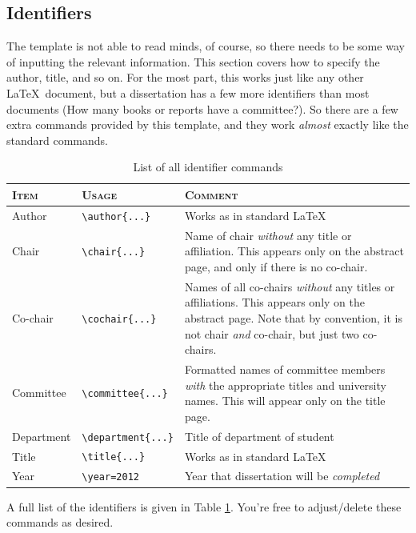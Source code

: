 \subsection{Identifiers}
The template is not able to read minds, of course, so there needs to be some way of inputting the relevant information.  
This section covers how to specify the author, title, and so on.  
For the most part, this works just like any other \LaTeX~document, but a dissertation has a few more identifiers than most documents (How many books or reports have a
committee?).  
So there are a few extra commands provided by this template, and they work \emph{almost} exactly like the standard commands.

\begin{table}
 \caption{ \label{tab:identifiers}
  List of all identifier commands}
 \centering
 \small
 \begin{tabular}{l @{\hspace{16pt}} l @{\hspace{16pt}} p{6cm}}
  \hline \hline
  \textsc{Item} & \textsc{Usage} & \textsc{Comment} \\
  \hline
  Author      & \verb|\author{...}|
   & Works as in standard \LaTeX \\
  Chair       & \verb|\chair{...}|
   & Name of chair \emph{without} any title or affiliation.  This
     appears only on the abstract page, and only if there is no
     co-chair. \\
  Co-chair    & \verb|\cochair{...}|
   & Names of all co-chairs \emph{without} any titles or
     affiliations.  This appears only on the abstract page.  Note
     that by convention, it is not chair \emph{and} co-chair, but
     just two co-chairs. \\
  Committee   & \verb|\committee{...}|
   & Formatted names of committee members \emph{with} the
     appropriate titles and university names.  This will appear
     only on the title page. \\
  Department  & \verb|\department{...}|
   & Title of department of student \\
  Title       & \verb|\title{...}|
   & Works as in standard \LaTeX \\
  Year        & \verb|\year=2012|
   & Year that dissertation will be \emph{completed} \\
  \hline \hline
 \end{tabular}
\end{table}

A full list of the identifiers is given in Table \cref{tab:identifiers}. 
You're free to adjust/delete these commands as desired.



